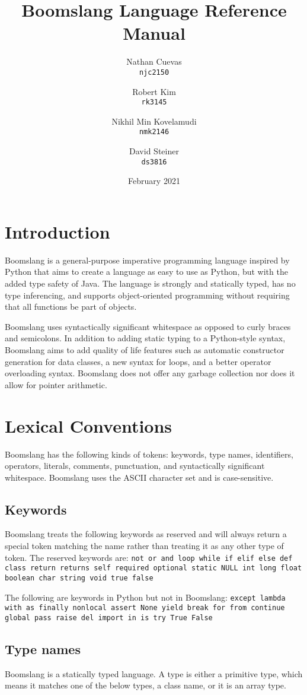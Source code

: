 \documentclass{article}
\title{Boomslang Language Reference Manual}
\author{
Nathan Cuevas\\
\texttt{njc2150} 
\and
Robert Kim\\
\texttt{rk3145} \and
Nikhil Min Kovelamudi \\
\texttt{nmk2146} \and
David Steiner \\
\texttt{ds3816}
}
\date{February 2021}
\begin{document}
\maketitle
\tableofcontents

\section{Introduction}
Boomslang is a general-purpose imperative programming language inspired by Python that aims to create a language as easy to use as Python, but with the added type safety of Java. The language is strongly and statically typed, has no type inferencing, and supports object-oriented programming without requiring that all functions be part of objects.

Boomslang uses syntactically significant whitespace as opposed to curly braces and semicolons. In addition to adding static typing to a Python-style syntax, Boomslang aims to add quality of life features such as automatic constructor generation for data classes, a new syntax for loops, and a better operator overloading syntax. Boomslang does not offer any garbage collection nor does it allow for pointer arithmetic.

\section{Lexical Conventions}
Boomslang has the following kinds of tokens: keywords, type names, identifiers, operators, literals, comments, punctuation, and syntactically significant whitespace. Boomslang uses the ASCII character set and is case-sensitive.

\subsection{Keywords}
Boomslang treats the following keywords as reserved and will always return a special token matching the name rather than treating it as any other type of token. The reserved keywords are:
\texttt{not or and loop while if elif else def class return returns self required optional static NULL int long float boolean char string void true false}

The following are keywords in Python but not in Boomslang: \texttt{except lambda with as finally nonlocal assert None yield break for from continue global pass raise del import in is try True False}

\subsection{Type names}
Boomslang is a statically typed language. A type is either a primitive type, which means it matches one of the below types, a class name, or it is an array type.
\end{document}
